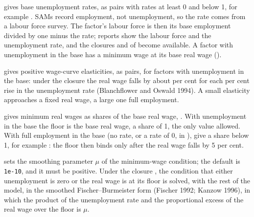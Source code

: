 \begin{optdesc}
\item[\optarg{unemp}{loyment}{spec}] gives base unemployment rates, as
\cmd{:} pairs with rates at least 0 and below 1, for
example . SAMs record employment, not
unemployment, so the rate comes from a labour force survey. The factor's labour
force is then its base employment divided by one minus the rate; reports show
the labour force and the unemployment rate, and the closures 
and  of  become available. A factor with
unemployment in the base has a minimum wage at its base real wage
().

\item[\optarg{wagec}{urve}{spec}] gives positive wage-curve elasticities, as
\cmd{:} pairs, for factors with unemployment in
the base: under the closure  the real wage falls by about
 per cent for each per cent rise in the unemployment rate
(Blanchflower and Oswald 1994). A small elasticity approaches a fixed real
wage, a large one full employment.

\item[\optarg{minw}{age}{spec}] gives minimum real wages as shares of the base
real wage, \cmd{:}. With unemployment in the base the
floor is the base real wage, a share of 1, the only value allowed. With full
employment in the base (no rate, or a rate of 0, in ), give
a share below 1, for example : the floor then binds only
after the real wage falls by 5 per cent.

\item[\optarg{smooth}{ing}{\#}] sets the smoothing parameter $\mu$ of the
minimum-wage condition; the default is \texttt{1e-10}, and it must be positive.
Under the closure , the condition that either unemployment is zero
or the real wage is at its floor is solved, with the rest of the model, in the
smoothed Fischer--Burmeister form (Fischer 1992; Kanzow 1996), in which the
product of the unemployment rate and the proportional excess of the real wage
over the floor is $\mu$.
\end{optdesc}


